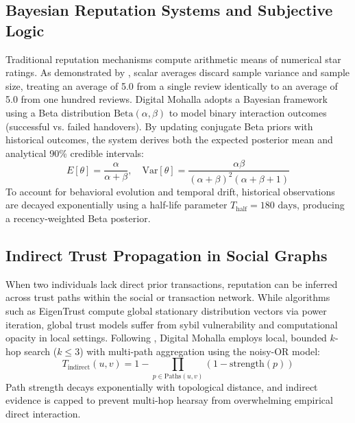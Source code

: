 \subsection{Bayesian Reputation Systems and Subjective Logic}
Traditional reputation mechanisms compute arithmetic means of numerical star ratings. As demonstrated by \citet{josang2007subjective}, scalar averages discard sample variance and sample size, treating an average of 5.0 from a single review identically to an average of 5.0 from one hundred reviews. Digital Mohalla adopts a Bayesian framework using a Beta distribution $\text{Beta}(\alpha, \beta)$ to model binary interaction outcomes (successful vs. failed handovers). By updating conjugate Beta priors with historical outcomes, the system derives both the expected posterior mean and analytical 90\% credible intervals:
\begin{equation}
    E[\theta] = \frac{\alpha}{\alpha + \beta}, \quad \text{Var}[\theta] = \frac{\alpha \beta}{(\alpha + \beta)^2 (\alpha + \beta + 1)}
\end{equation}
To account for behavioral evolution and temporal drift, historical observations are decayed exponentially using a half-life parameter $T_{\text{half}} = 180\text{ days}$, producing a recency-weighted Beta posterior.

\subsection{Indirect Trust Propagation in Social Graphs}
When two individuals lack direct prior transactions, reputation can be inferred across trust paths within the social or transaction network. While algorithms such as EigenTrust \citep{kamvar2003eigentrust} compute global stationary distribution vectors via power iteration, global trust models suffer from sybil vulnerability and computational opacity in local settings. Following \citet{massa2007trust}, Digital Mohalla employs local, bounded $k$-hop search ($k \le 3$) with multi-path aggregation using the noisy-OR model:
\begin{equation}
    T_{\text{indirect}}(u, v) = 1 - \prod_{p \in \text{Paths}(u, v)} \left(1 - \text{strength}(p)\right)
\end{equation}
Path strength decays exponentially with topological distance, and indirect evidence is capped to prevent multi-hop hearsay from overwhelming empirical direct interaction.

